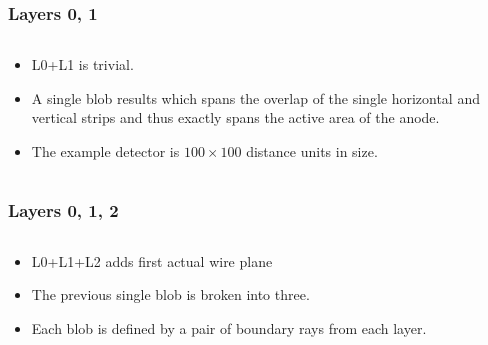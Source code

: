 \documentclass[xcolor=dvipsnames]{beamer}
\begin{document}
\begin{frame}
  \frametitle{Layers 0, 1}
  \begin{columns}
    \begin{column}{0.35\textwidth}
      \footnotesize
      \begin{itemize}
      \item L0+L1 is trivial.
      \item A single blob results which spans the  overlap of the single horizontal and vertical strips and thus exactly spans the active area of the anode.
      \item The example detector is $100\times100$ distance units in size.
      \end{itemize}
      
    \end{column}

    \begin{column}{0.7\textwidth}

      \begin{center}
        \tiny
        
      \end{center}
    \end{column}

  \end{columns}
\end{frame}

\begin{frame}
  \frametitle{Layers 0, 1, 2}
  \begin{columns}
    \begin{column}{0.35\textwidth}
      \footnotesize
      \begin{itemize}
      \item L0+L1+L2 adds first actual wire plane
      \item The previous single blob is broken into three.
      \item Each blob is defined by a pair of boundary rays from each layer.
      \end{itemize}
      
    \end{column}

    \begin{column}{0.7\textwidth}

      \begin{center}
        \tiny
        
      \end{center}
    \end{column}

  \end{columns}
\end{frame}
\end{document}
